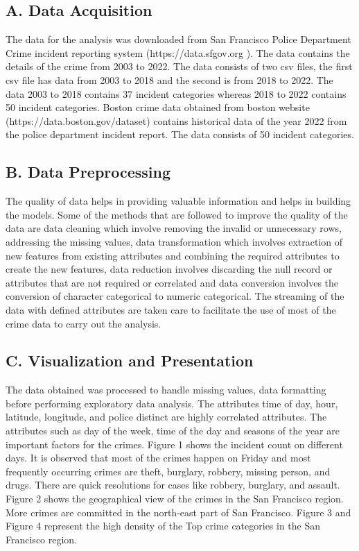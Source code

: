 \documentclass[conference,final,]{IEEEtran}
\begin{document}
\subsection{A. Data Acquisition}\label{a.-data-acquisition}

The data for the analysis was downloaded from San Francisco Police
Department Crime incident reporting system (https://data.sfgov.org ).
The data contains the details of the crime from 2003 to 2022. The data
consists of two csv files, the first csv file has data from 2003 to 2018
and the second is from 2018 to 2022. The data 2003 to 2018 contains 37
incident categories whereas 2018 to 2022 contains 50 incident
categories. Boston crime data obtained from boston website
(https://data.boston.gov/dataset) contains historical data of the year
2022 from the police department incident report. The data consists of 50
incident categories.

\subsection{B. Data Preprocessing}\label{b.-data-preprocessing}

The quality of data helps in providing valuable information and helps in
building the models. Some of the methods that are followed to improve
the quality of the data are data cleaning which involve removing the
invalid or unnecessary rows, addressing the missing values, data
transformation which involves extraction of new features from existing
attributes and combining the required attributes to create the new
features, data reduction involves discarding the null record or
attributes that are not required or correlated and data conversion
involves the conversion of character categorical to numeric categorical.
The streaming of the data with defined attributes are taken care to
facilitate the use of most of the crime data to carry out the analysis.

\subsection{C. Visualization and
Presentation}\label{c.-visualization-and-presentation}

The data obtained was processed to handle missing values, data
formatting before performing exploratory data analysis. The attributes
time of day, hour, latitude, longitude, and police distinct are highly
correlated attributes. The attributes such as day of the week, time of
the day and seasons of the year are important factors for the crimes.
Figure 1 shows the incident count on different days. It is observed that
most of the crimes happen on Friday and most frequently occurring crimes
are theft, burglary, robbery, missing person, and drugs. There are quick
resolutions for cases like robbery, burglary, and assault. Figure 2
shows the geographical view of the crimes in the San Francisco region.
More crimes are committed in the north-east part of San Francisco.
Figure 3 and Figure 4 represent the high density of the Top crime
categories in the San Francisco region.
\end{document}
